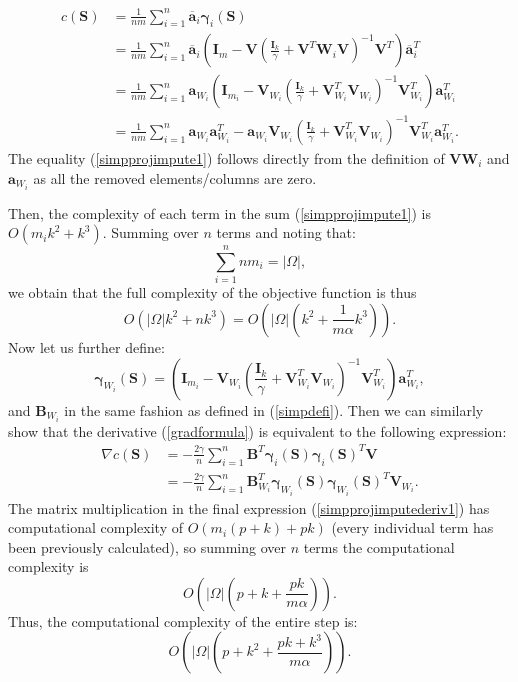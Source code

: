 \documentclass[twoside,11pt]{article}
\begin{document}
\begin{align}
    c(\bm{S})&=\frac{1}{nm}\sum_{i =1}^n \overline{\bm{a}}_i\bm{\gamma}_i(\bm{S})
    \nonumber\\&=\frac{1}{nm}\sum_{i =1}^n \overline{\bm{a}}_i\left(\bm{I}_m-\bm{V}\left(\frac{\bm{I}_k}{\gamma}+\bm{V}^T\bm{W}_i\bm{V}\right)^{-1}\bm{V}^T\right)\overline{\bm{a}}_i^T\nonumber \\&=\frac{1}{nm}\sum_{i =1}^n \bm{a}_{W_i}\left(\bm{I}_{m_i}-\bm{V}_{W_i}\left(\frac{\bm{I}_k}{\gamma}+\bm{V}_{W_i}^T\bm{V}_{W_i}\right)^{-1}\bm{V}_{W_i}^T\right)\bm{a}_{W_i}^T  \label{simpprojimpute1} \\&=\frac{1}{nm}\sum_{i =1}^n \bm{a}_{W_i}\bm{a}_{W_i}^T- \bm{a}_{W_i}\bm{V}_{W_i}\left(\frac{\bm{I}_k}{\gamma}+\bm{V}_{W_i}^T\bm{V}_{W_i}\right)^{-1}\bm{V}_{W_i}^T\bm{a}_{W_i}^T.
    \nonumber
\end{align}
The equality (\ref{simpprojimpute1}) follows directly from the definition of $\bm{V}\bm{W}_i$ and $\bm{a}_{W_i}$ as all the removed elements/columns are zero.

Then, the complexity of each term in the sum (\ref{simpprojimpute1}) is $O(m_ik^2+k^3)$. Summing over $n$ terms and noting that:
$$\sum_{i=1}^n nm_i=|\Omega|,$$
we obtain that the full complexity of the objective function is thus $$O(|\Omega| k^2+nk^3)=O\left(|\Omega|\left(k^2 + \frac{1}{m\alpha} k^3\right)\right).$$
Now let us further define:
\begin{equation}
    \bm{\gamma}_{W_i}(\bm{S})=\left(\bm{I}_{m_i}-\bm{V}_{W_i}\left(\frac{\bm{I}_k}{\gamma}+\bm{V}_{W_i}^T\bm{V}_{W_i}\right)^{-1}\bm{V}_{W_i}^T\right)\bm{a}_{W_i}^T, \label{simpgamma}
\end{equation}
and $\bm{B}_{W_i}$ in the same fashion as defined in (\ref{simpdefi}). Then we can similarly show that the derivative (\ref{gradformula}) is equivalent to the following expression:
\begin{align}
    \nabla c(\bm{S})&=-\frac{2 \gamma}{n} \sum_{i=1}^n  \bm{B}^T\bm{\gamma}_i(\bm{S})\bm{\gamma}_i(\bm{S})^T\bm{V} \\&=-\frac{2 \gamma}{n} \sum_{i=1}^n  \bm{B}^T_{W_i}\bm{\gamma}_{W_i}(\bm{S})\bm{\gamma}_{W_i}(\bm{S})^T\bm{V}_{W_i}. \label{simpprojimputederiv1}
\end{align}
The matrix multiplication in the final expression (\ref{simpprojimputederiv1}) has computational complexity of $O(m_i(p+k)+pk)$ (every individual term has been previously calculated), so summing over $n$ terms the computational complexity is 
$$O\left(|\Omega|\left(p+k+\frac{pk}{m\alpha}\right)\right).$$
Thus, the computational complexity of the entire step is:
$$O\left(|\Omega| \left(p+k^2+\frac{pk+k^3}{m\alpha}\right)\right).$$
\end{document}
